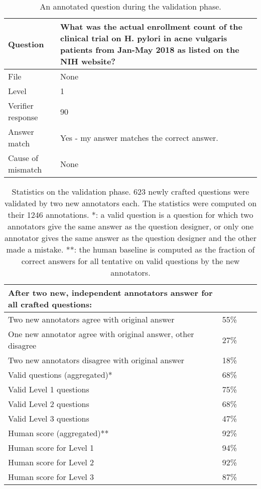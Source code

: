 \documentclass{fairmeta}
\begin{document}
\begin{table}[]
    \centering
    \small
    \begin{tabularx}{\textwidth}{lX}
        \toprule
         Question & What was the actual enrollment count of the clinical trial on H. pylori in acne vulgaris patients from Jan-May 2018 as listed on the NIH website? \\
         \midrule
         File & None\\
         \midrule
         Level & 1 \\
        \midrule
        Verifier response & 90 \\
        \midrule
        Answer match & Yes - my answer matches the correct answer. \\
        \midrule
        Cause of mismatch & None \\
        \bottomrule
    \end{tabularx}
    \caption{An annotated question during the validation phase.}
    \label{tab:annotated_question_validation}
\end{table}


\begin{table}[]
\small
    \centering
    \begin{tabular}{lccc}
        \toprule
        After two new, independent annotators answer for all crafted questions: & \\
        \midrule 
        Two new annotators agree with original answer & 55\% \\
        One new annotator agree with original answer, other disagree & 27\% \\
        Two new annotators disagree with original answer & 18\% \\
        \midrule
        Valid questions (aggregated)* & 68\% \\
        \midrule
        Valid Level 1 questions & 75\% \\
        Valid Level 2 questions & 68\% \\
        Valid Level 3 questions & 47\% \\
        \midrule
        Human score (aggregated)** & 92\% \\
        \midrule
        Human score for Level 1 & 94\% \\
        Human score for Level 2 & 92\% \\
        Human score for Level 3 & 87\% \\
        \bottomrule
    \end{tabular}
    \caption{Statistics on the validation phase. 623 newly crafted questions were validated by two new annotators each. The statistics were computed on their 1246 annotations. *: a valid question is a question for which two annotators give the same answer as the question designer, or only one annotator gives the same answer as the question designer and the other made a mistake. **: the human baseline is computed as the fraction of correct answers for all tentative on valid questions by the new annotators.}
    \label{tab:ambiguity_stats}
\end{table}
\end{document}
